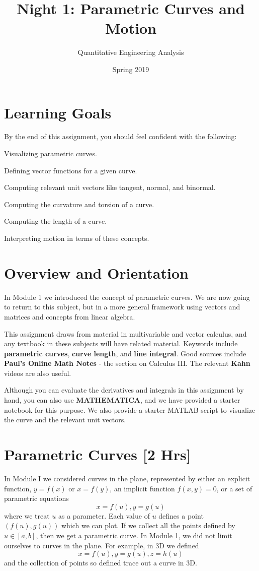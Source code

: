 \documentclass[M3_Night1_Solutions]{subfiles}
\title{Night 1: Parametric Curves and Motion}
\author{Quantitative Engineering Analysis}
\date{Spring 2019}
\begin{document}
\maketitle
\thispagestyle{firstpage}

\section{Learning Goals}
By the end of this assignment, you should feel confident with the following:
\bi
\item Visualizing parametric curves.
\item Defining vector functions for a given curve.
\item Computing relevant unit vectors like tangent, normal, and binormal.
\item Computing the curvature and torsion of a curve.
\item Computing the length of a curve.
\item Interpreting motion in terms of these concepts.
\ei

\section{Overview and Orientation}

In Module 1 we introduced the concept of parametric curves. We are now going to return to this subject, but in a more general framework using vectors and matrices and concepts from linear algebra.

This assignment draws from material in multivariable and vector calculus, and any textbook in these subjects will have related material. Keywords include {\bf parametric curves},  {\bf curve length}, and {\bf line integral}. Good sources include {\bf Paul's Online Math Notes} - the section on Calculus III. The relevant {\bf Kahn} videos are also useful.

Although you can evaluate the derivatives and integrals in this assignment by hand, you can also use {\bf MATHEMATICA}, and we have provided a starter notebook for this purpose. We also provide a starter MATLAB script to visualize the curve and the relevant unit vectors.

\section{Parametric Curves [2 Hrs]}
In Module I we considered curves in the plane, represented by either an explicit function, $y = f(x)$ or $x = f(y)$, an implicit function $f(x,y) = 0$, or a set of parametric equations
\[x = f(u), y = g(u) \]
where we treat $u$ as a parameter. Each value of $u$ defines a point $(f(u),g(u))$ which we can plot. If we collect all the points defined by $u \in [a,b]$, then we get a parametric curve. In Module 1, we did not limit ourselves to curves in the plane. For example, in 3D we defined
\[x = f(u), y = g(u), z = h(u) \]
and the collection of points so defined trace out a curve in 3D.
\end{document}
